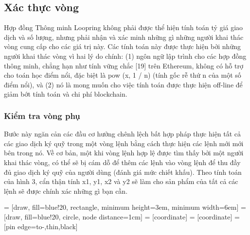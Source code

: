 \documentclass[12pt,a4paper]{article}
\makeatletter
\newenvironment{figurehere}
 {\def\@captype{figure}}
 {}
\makeatother
\begin{document}
\begin{multicols}{2}
\subsection{Xác thực vòng\label{sec:ring_verification}}
Hợp đồng Thông minh Loopring không phải được thể hiện tính toán tỷ giá giao dịch và số lượng, nhưng phải nhận và xác minh những gì những người khai thác vòng cung cấp cho các giá trị này. Các tính toán này được thực hiện bởi những người khai thác vòng vì hai lý do chính: (1) ngôn ngữ lập trình cho các hợp đồng thông minh, chẳng hạn như tính vững chắc [19] trên Ethereum, không có hỗ trợ cho toán học điểm nổi, đặc biệt là pow (x, 1 / n) (tính gốc rễ thứ n của một số điểm nổi), và (2) nó là mong muốn cho việc tính toán được thực hiện off-line để giảm bớt tính toán và chi phí blockchain.

\subsubsection{Kiểm tra vòng phụ \label{sec:sub_ring_check}}
Bước này ngăn cản các đầu cơ hưởng chênh lệch bất hợp pháp thực hiện tất cả các giao dịch ký quỹ trong một vòng lệnh bằng cách thực hiện các lệnh mới mới bên trong nó. Về cơ bản, một khi vòng lệnh hợp lệ được tìm thấy bởi một người khai thác vòng, có thể sẽ bị cám dỗ để thêm các lệnh vào vòng lệnh để thu đầy đủ giao dịch ký quỹ của người dùng (đánh giá mức chiết khấu). Theo tính toán của hình 3, cẩn thận tính x1, y1, x2 và y2 sẽ làm cho sản phẩm của tất cả các lệnh sẽ được chính xác những gì bạn cần.
\begin{center}
\begin{figurehere}
\centering
{} = [draw, fill=blue!20, rectangle,
    minimum height=3em, minimum width=6em]
 = [draw, fill=blue!20, circle, node distance=1cm]
 = [coordinate]
 = [coordinate]
 = [pin edge={to-,thin,black}]

\end{figurehere}
\end{center}
\end{multicols}
\end{document}
